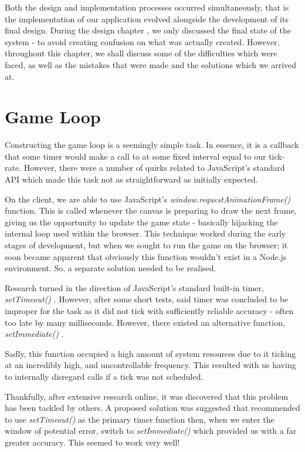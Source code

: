 \documentclass{standalone}
\begin{document}
	Both the design and implementation processes occurred simultaneously, that is the implementation of our application evolved alongside the development of its final design. During the design chapter , we only discussed the final state of the system - to avoid creating confusion on what was actually created. However, throughout this chapter, we shall discuss some of the difficulties which were faced, as well as the mistakes that were made and the solutions which we arrived at.

	\section{Game Loop}
		Constructing the game loop is a seemingly simple task. In essence, it is a callback that some timer would make a call to at some fixed interval equal to our tick-rate. However, there were a number of quirks related to JavaScript's standard API which made this task not as straightforward as initially expected.

		On the client, we are able to use JavaScript's \emph{window.requestAnimationFrame()} \parencite{JsRequestAnimationFrame} function. This is called whenever the canvas is preparing to draw the next frame, giving us the opportunity to update the game state - basically hijacking the internal loop used within the browser. This technique worked during the early stages of development, but when we sought to run the game on the browser; it soon became apparent that obviously this function wouldn't exist in a Node.js environment. So, a separate solution needed to be realised.

		Research turned in the direction of JavaScript's standard built-in timer, \emph{setTimeout()} \parencite{JsSetTimeout}. However, after some short tests, said timer was concluded to be improper for the task as it did not tick with sufficiently reliable accuracy - often too late by many milliseconds. However, there existed an alternative function, \emph{setImmediate()} \parencite{JsSetImmediate}. 

		Sadly, this function occupied a high amount of system resources due to it ticking at an incredibly high, and uncontrollable frequency. This resulted with us having to internally disregard calls if a tick was not scheduled.

		Thankfully, after extensive research online, it was discovered that this problem has been tackled by others. A proposed solution\parencite{JsGameLoop} was suggested that recommended to use \emph{setTimeout()} as the primary timer function then, when we enter the window of potential error, switch to \emph{setImmediate()} which provided us with a far greater accuracy. This seemed to work very well!
\end{document}
